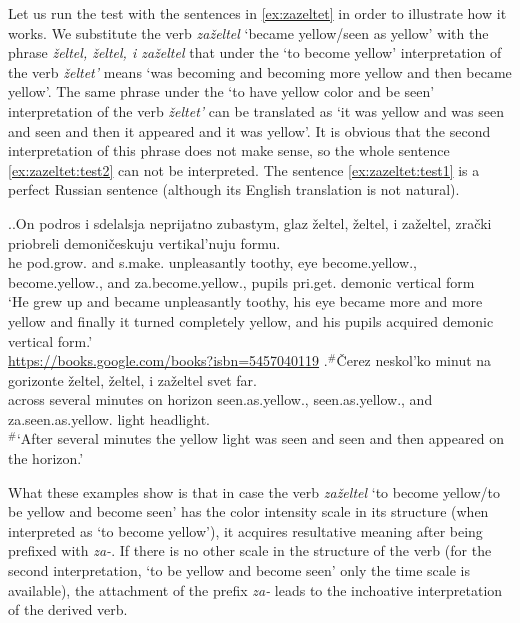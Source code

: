 Let us run the test with the sentences in \ref{ex:zazeltet} in order to illustrate how it works. We substitute the verb \textit{za\v{z}eltel} `became yellow/seen as yellow' with the phrase \textit{\v{z}eltel, \v{z}eltel, i za\v{z}eltel} that under the `to become yellow' interpretation of the verb \textit{\v{z}eltet'} means `was becoming and becoming more yellow and then became yellow'. The same phrase under the `to have yellow color and be seen' interpretation of the verb \textit{\v{z}eltet'} can be translated as `it was yellow and was seen and seen and then it appeared and it was yellow'. It is obvious that the second interpretation of this phrase does not make sense, so the whole sentence \ref{ex:zazeltet:test2} can not be interpreted. The sentence \ref{ex:zazeltet:test1} is a perfect Russian sentence (although its English translation is not natural).

\ex.\label{ex:zazeltet:test}\ag.\label{ex:zazeltet:test1}On podros i sdelalsja neprijatno zubastym, glaz \v{z}eltel, \v{z}eltel, i za\v{z}eltel, zra\v{c}ki priobreli demoni\v{c}eskuju vertikal'nuju formu.\\
he pod.grow. and s.make. unpleasantly toothy, eye become.yellow., become.yellow., and za.become.yellow., pupils pri.get. demonic vertical form\\
\trans `He grew up and became unpleasantly toothy, his eye became more and more yellow and finally it turned completely yellow, and his pupils acquired demonic vertical form.'\\\hbox{}\hfill\hbox{\url{https://books.google.com/books?isbn=5457040119}}
\bg.$^\#$\v{C}erez neskol'ko minut na gorizonte \v{z}eltel, \v{z}eltel, i za\v{z}eltel svet far.\label{ex:zazeltet:test2}\\
across several minutes on horizon seen.as.yellow., seen.as.yellow., and za.seen.as.yellow. light headlight.\\
\trans $^\#$`After several minutes the yellow light was seen and seen and then appeared on the horizon.'

What these examples show is that in case the verb \textit{za\v{z}eltel} `to become yellow/to be yellow and become seen' has the color intensity scale in its structure (when interpreted as `to become yellow'), it acquires resultative meaning after being prefixed with \textit{za-}. If there is no other scale in the structure of the verb (for the second interpretation, `to be yellow and become seen' only the time scale is available), the attachment of the prefix \textit{za-} leads to the inchoative interpretation of the derived verb.

